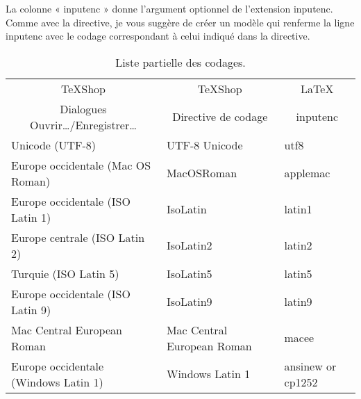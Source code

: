 \documentclass[11pt,french]{article}
\newcommand{\TS}{\textsf{\TeX Shop}}
\begin{document}
La colonne « inputenc » donne l'argument optionnel de l'extension inputenc. Comme avec la directive, je vous suggère de créer un modèle qui renferme la ligne inputenc avec le codage correspondant à celui indiqué dans la directive.


\begin{table}[H]
\centering
\begin{tabular}{lll}
\multicolumn{1}{c}{\TS} & \multicolumn{1}{c}{\TS} & \multicolumn{1}{c}{\LaTeX} \\
\multicolumn{1}{c}{Dialogues Ouvrir…/Enregistrer…} & \multicolumn{1}{c}{Directive de codage} & \multicolumn{1}{c}{inputenc} \\
\cmidrule[0.5pt](lr){1-1} \cmidrule[0.5pt](lr){2-2} \cmidrule[0.5pt](lr){3-3}
Unicode (UTF-8) & UTF-8 Unicode & utf8 \\
Europe occidentale (Mac OS Roman) & MacOSRoman & applemac \\
Europe occidentale (ISO Latin 1) & IsoLatin & latin1 \\
Europe centrale (ISO Latin 2) & IsoLatin2 & latin2 \\
Turquie (ISO Latin 5) & IsoLatin5 & latin5 \\
Europe occidentale (ISO Latin 9) & IsoLatin9 & latin9 \\
Mac Central European Roman & Mac Central European Roman & macee \\
Europe occidentale (Windows Latin 1) & Windows Latin 1 & ansinew or cp1252\\
\end{tabular}
\caption{Liste partielle des codages.}\label{tbl:enclist}
\end{table}
\end{document}
